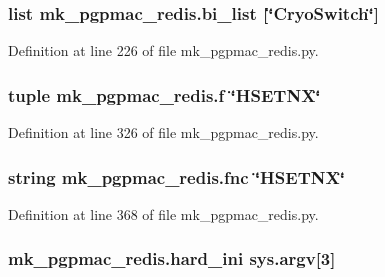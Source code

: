 \hypertarget{namespacemk__pgpmac__redis_a961bfabfbdcbf5b749f6e6ecdc733619}{
\subsubsection[{bi\-\_\-list}]{\setlength{\rightskip}{0pt plus 5cm}list mk\-\_\-pgpmac\-\_\-redis.\-bi\-\_\-list \mbox{[}\char`\"{}Cryo\-Switch\char`\"{}\mbox{]}}}\label{namespacemk__pgpmac__redis_a961bfabfbdcbf5b749f6e6ecdc733619}


Definition at line 226 of file mk\-\_\-pgpmac\-\_\-redis.\-py.

\hypertarget{namespacemk__pgpmac__redis_a057fe7457503e0de97edcf855591ed58}{
\subsubsection[{f}]{\setlength{\rightskip}{0pt plus 5cm}tuple mk\-\_\-pgpmac\-\_\-redis.\-f \char`\"{}H\-S\-E\-T\-N\-X\char`\"{}}}\label{namespacemk__pgpmac__redis_a057fe7457503e0de97edcf855591ed58}


Definition at line 326 of file mk\-\_\-pgpmac\-\_\-redis.\-py.

\hypertarget{namespacemk__pgpmac__redis_a654b54ba0758b8b84516938260851129}{
\subsubsection[{fnc}]{\setlength{\rightskip}{0pt plus 5cm}string mk\-\_\-pgpmac\-\_\-redis.\-fnc \char`\"{}H\-S\-E\-T\-N\-X\char`\"{}}}\label{namespacemk__pgpmac__redis_a654b54ba0758b8b84516938260851129}


Definition at line 368 of file mk\-\_\-pgpmac\-\_\-redis.\-py.

\hypertarget{namespacemk__pgpmac__redis_a5864d9c27cbe61534756880cbfebe4f1}{
\subsubsection[{hard\-\_\-ini}]{\setlength{\rightskip}{0pt plus 5cm}mk\-\_\-pgpmac\-\_\-redis.\-hard\-\_\-ini sys.\-argv\mbox{[}3\mbox{]}}}\label{namespacemk__pgpmac__redis_a5864d9c27cbe61534756880cbfebe4f1}


